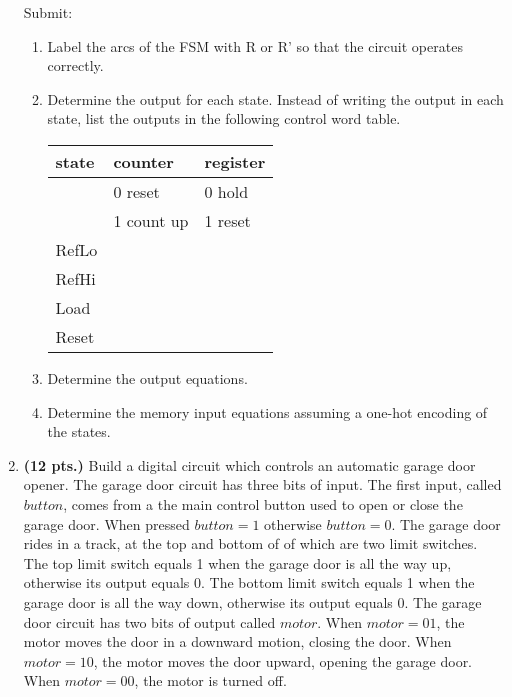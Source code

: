 \begin{enumerate}

        Submit:
        \begin{enumerate}
            \item Label the arcs of the FSM with R or R' so that the
                circuit operates correctly.
            \item Determine the output for each state.  Instead of writing the
                output in each state, list the outputs in the following control
                word table.

                \begin{tabular}{l||l|l}
                    state    & counter    & register \\ \hline
                    & 0 reset    & 0 hold \\ \hline
                    & 1 count up& 1 reset \\ \hline \hline
                    RefLo    &        &      \\ \hline
                    RefHi    &        &      \\ \hline
                    Load     &        &      \\ \hline
                    Reset    &        &      \\
                \end{tabular}

            \item Determine the output equations.
            \item Determine the memory input equations assuming a one-hot
                encoding of the states.
        \end{enumerate}

    \item \textbf{ (12 pts.)}
        Build a digital circuit which controls an automatic garage door opener.
        The garage door circuit has three bits of input.  The first input, called
        $button$, comes from a the main control button used to open or close the
        garage door.  When pressed $button=1$ otherwise $button=0$.  The garage
        door rides in a track, at the top and bottom of of which are two
        limit switches.  The top limit switch equals 1 when the garage door
        is all the way up, otherwise its output equals 0.  The bottom limit
        switch equals 1 when the garage door is all the way down, otherwise
        its output equals 0.  The garage door circuit has two bits of output
        called $motor$.  When $motor=01$, the motor moves the door in a downward
        motion, closing the door.  When $motor=10$, the motor moves the door
        upward, opening the garage door.  When $motor=00$, the motor is turned off.


\end{enumerate}

